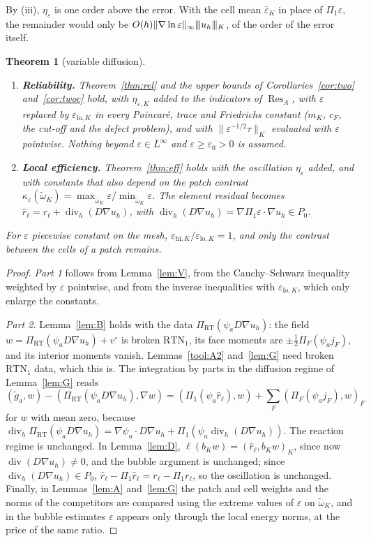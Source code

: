 \documentclass[11pt]{article}
\newcommand{\tnorm}[1]{\lvert\kern-0.25ex\lvert\kern-0.25ex\lvert #1\rvert\kern-0.25ex\rvert\kern-0.25ex\rvert}
\newcommand{\eps}{\varepsilon}
\newcommand{\Res}{\operatorname{Res}}
\newcommand{\RT}{\mathrm{RT}}
\newcommand{\RTN}{\mathrm{RTN}_1}
\newcommand{\dv}{\operatorname{div}}
\theoremstyle{plain}
\newtheorem{theorem}{Theorem}[section]
\theoremstyle{remark}
\numberwithin{equation}{section}
\begin{document}
By (iii), $\eta_\eps$ is one order above the error. With the cell mean $\bar\eps_K$ in place of
$\Pi_1\eps$, the remainder would only be $O(h)\|\nabla\ln\eps\|_\infty\tnorm{u_h}_K$, of the order of
the error itself.

\begin{theorem}[variable diffusion]\label{thm:vareps}
\leavevmode
\begin{enumerate}
  \item \textbf{Reliability.} Theorem~\ref{thm:rel} and the upper bounds of
  Corollaries~\ref{cor:two} and~\ref{cor:twoc} hold, with $\eta_{\eps,K}$ added to the indicators of
  $\Res_A$, with $\eps$ replaced by $\eps_{\mathrm{lo},K}$ in every Poincar\'e, trace and Friedrichs
  constant ($m_K$, $c_F$, the cut-off and the defect problem), and with
  $\|\eps^{-1/2}\tau\|_K$ evaluated with $\eps$ pointwise. Nothing beyond $\eps\in L^\infty$ and
  $\eps\ge\eps_0>0$ is assumed.
  \item \textbf{Local efficiency.} Theorem~\ref{thm:eff} holds with the oscillation $\eta_\eps$
  added, and with constants that also depend on the patch contrast
  $\kappa_\eps(\tilde\omega_K)=\max_{\tilde\omega_K}\eps/\min_{\tilde\omega_K}\eps$. The element
  residual becomes $\hat r_\ell=r_\ell+\dv_h(D\nabla u_h)$, with
  $\dv_h(D\nabla u_h)=\nabla\Pi_1\eps\cdot\nabla u_h\in P_0$.
\end{enumerate}
For $\eps$ piecewise constant on the mesh, $\eps_{\mathrm{hi},K}/\eps_{\mathrm{lo},K}=1$, and only the
contrast between the cells of a patch remains.
\end{theorem}

\begin{proof}
\emph{Part 1} follows from Lemma~\ref{lem:V}, from the Cauchy--Schwarz inequality weighted by $\eps$
pointwise, and from the inverse inequalities with $\eps_{\mathrm{lo},K}$, which only enlarge the
constants.

\emph{Part 2.} Lemma~\ref{lem:B} holds with the data $\Pi_{\RT}(\psi_aD\nabla u_h)$: the field
$w=\Pi_{\RT}(\psi_aD\nabla u_h)+v^\circ$ is broken $\RTN$, its face moments are
$\pm\frac12\Pi_F(\psi_aj_F)$, and its interior moments vanish. Lemmas~\ref{tool:A2} and~\ref{lem:G}
need broken $\RTN$ data, which this is. The integration by parts in the diffusion regime of
Lemma~\ref{lem:G} reads
\[
  (\tilde g_a,w)-(\Pi_{\RT}(\psi_aD\nabla u_h),\nabla w)
  =(\Pi_1(\psi_a\hat r_\ell),w)+\sum_F(\Pi_F(\psi_aj_F),w)_F
\]
for $w$ with mean zero, because
$\dv_h\Pi_{\RT}(\psi_aD\nabla u_h)=\nabla\psi_a\cdot D\nabla u_h+\Pi_1(\psi_a\dv_h(D\nabla u_h))$.
The reaction regime is unchanged. In Lemma~\ref{lem:D}, $\ell(b_Kw)=(\hat r_\ell,b_Kw)_K$, since now
$\dv(D\nabla u_h)\ne0$, and the bubble argument is unchanged; since $\dv_h(D\nabla u_h)\in P_0$,
$\hat r_\ell-\Pi_1\hat r_\ell=r_\ell-\Pi_1r_\ell$, so the oscillation is unchanged. Finally, in
Lemmas~\ref{lem:A} and~\ref{lem:G} the patch and cell weights and the norms of the competitors are
compared using the extreme values of $\eps$ on $\tilde\omega_K$, and in the bubble estimates $\eps$
appears only through the local energy norms, at the price of the same ratio.
\end{proof}
\end{document}
